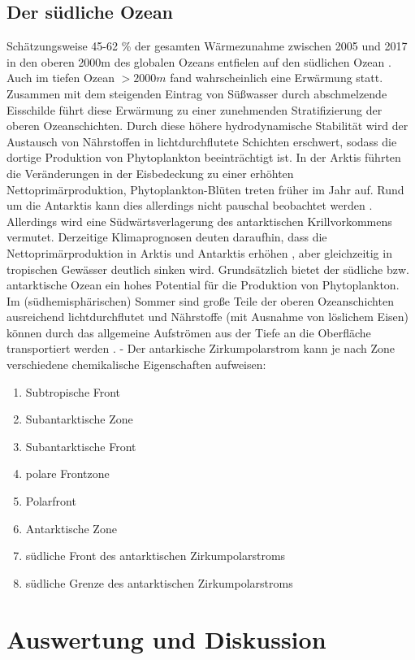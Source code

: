 \documentclass[12pt,a4paper,onecolumn]{scrartcl}
\begin{document}
\subsection{Der südliche Ozean}
Schätzungsweise 45-62 \% der gesamten Wärmezunahme zwischen 2005 und 2017 in den oberen 2000m des globalen Ozeans entfielen auf den südlichen Ozean \citep{IPCCpol.2019}. Auch im tiefen Ozean $>2000m$ fand wahrscheinlich eine Erwärmung statt. Zusammen mit dem steigenden Eintrag von Süßwasser durch abschmelzende Eisschilde führt diese Erwärmung zu  einer zunehmenden Stratifizierung der oberen Ozeanschichten. Durch diese höhere hydrodynamische Stabilität wird  der Austausch von Nährstoffen in lichtdurchflutete Schichten erschwert, sodass die dortige Produktion von Phytoplankton beeinträchtigt ist. In der Arktis führten die Veränderungen in der Eisbedeckung zu einer erhöhten Nettoprimärproduktion, Phytoplankton-Blüten treten früher im Jahr auf. Rund um die Antarktis kann dies allerdings nicht pauschal beobachtet werden \citep{IPCCpol.2019}. Allerdings wird eine Südwärtsverlagerung des antarktischen Krillvorkommens vermutet. Derzeitige Klimaprognosen deuten daraufhin, dass die Nettoprimärproduktion in Arktis und Antarktis erhöhen , aber gleichzeitig in tropischen Gewässer deutlich sinken wird. Grundsätzlich bietet der südliche bzw. antarktische Ozean ein hohes Potential für die Produktion von Phytoplankton. Im (südhemisphärischen) Sommer sind große Teile der oberen Ozeanschichten ausreichend lichtdurchflutet und Nährstoffe (mit Ausnahme von löslichem Eisen) können durch das allgemeine Aufströmen aus der Tiefe an die Oberfläche transportiert werden \citep{Martin.1990}. -  Der antarkische Zirkumpolarstrom kann je nach Zone verschiedene chemikalische Eigenschaften aufweisen:

\begin{enumerate}
\item Subtropische Front
\item Subantarktische Zone
\item Subantarktische Front
\item polare Frontzone
\item Polarfront
\item Antarktische Zone
\item südliche Front des antarktischen Zirkumpolarstroms
\item südliche Grenze des antarktischen Zirkumpolarstroms
\end{enumerate}

\section{Auswertung und Diskussion}
\end{document}
